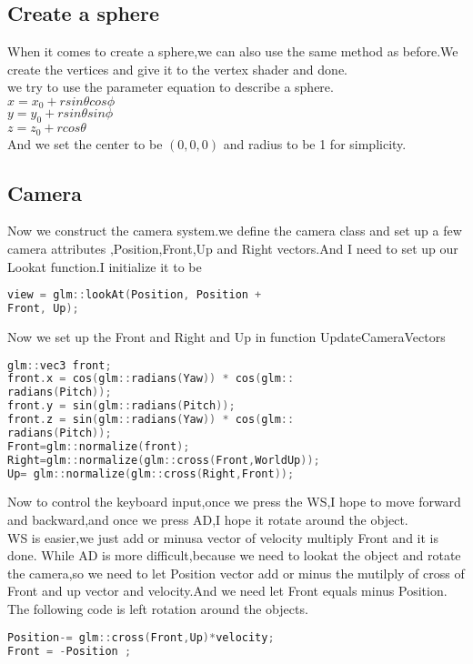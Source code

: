 \documentclass[acmtog]{acmart}
\begin{document}
\subsection{Create a sphere}
When it comes to create a sphere,we can also use the same method as before.We create the vertices and give it to the vertex shader and done.\\
we try to use the parameter equation to describe a sphere.\\
$x=x_0+r sin\theta cos\phi$\\
$y=y_0+r sin\theta sin\phi$\\
$z=z_0+r cos\theta$\\
And we set the center to be $(0,0,0)$ and radius to be 1 for simplicity.

\subsection{Camera}
Now we construct the camera system.we define the camera class and set up a few camera attributes ,Position,Front,Up and Right vectors.And I need to set up our Lookat function.I initialize it to be 
\begin{lstlisting}[language=C]
view = glm::lookAt(Position, Position + 
Front, Up);
\end{lstlisting} 
Now we set up the Front and Right and Up in function UpdateCameraVectors
\begin{lstlisting}[language=C]
glm::vec3 front;
front.x = cos(glm::radians(Yaw)) * cos(glm::
radians(Pitch));
front.y = sin(glm::radians(Pitch));
front.z = sin(glm::radians(Yaw)) * cos(glm::
radians(Pitch));
Front=glm::normalize(front);
Right=glm::normalize(glm::cross(Front,WorldUp)); 
Up= glm::normalize(glm::cross(Right,Front));
\end{lstlisting} 
Now to control the keyboard input,once we press the WS,I hope to move forward and backward,and once we press AD,I hope it rotate around the object.\\
WS is easier,we just add or minusa vector of velocity multiply Front and it is done.
While AD is more difficult,because we need to lookat the object and rotate the camera,so we need to let Position vector add or minus the mutilply of cross of  Front and up vector and velocity.And we need let Front equals minus Position.\\
The following code is left rotation around the objects.
\begin{lstlisting}[language=C]
Position-= glm::cross(Front,Up)*velocity;  
Front = -Position ;
\end{lstlisting} 
\end{document}
